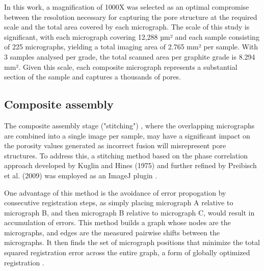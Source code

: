 \documentclass[3p,twocolumn]{elsarticle}
\begin{document}
In this work, a magnification of 1000X was selected as an optimal compromise
between the resolution necessary for capturing the pore structure at the
required scale and the total area covered by each micrograph. The scale of this
study is significant, with each micrograph covering 12,288 µm² and each sample
consisting of 225 micrographs, yielding a total imaging area of 2.765 mm² per
sample. With 3 samples analysed per grade, the total scanned area per graphite grade is
8.294 mm². Given this scale, each composite micrograph represents a substantial
section of the sample and captures a thousands of pores.

\subsection{Composite assembly}

The composite assembly stage ("stitching") , where the overlapping micrographs
are combined into a single image per sample, may have a significant impact on
the porosity values generated as incorrect fusion will misrepresent pore
structures. To address this, a stitching method based on the phase correlation
approach developed by Kuglin and Hines (1975) and further refined by Preibisch
et al. (2009) was employed as an ImageJ plugin \citep{Kuglin1975,
Preibisch2009}.
	
One advantage of this method is the avoidance of error propogation by
consecutive registration steps, as simply placing micrograph A relative to
micrograph B, and then micrograph B relative to micrograph C, would result in
accumulation of errors. This method builds a graph whose nodes are the
micrographs, and edges are the measured pairwise shifts between the micrographs.
It then finds the set of micrograph positions that minimize the total squared
registration error across the entire graph, a form of globally optimized
registration \citep{Preibisch2009}.
\end{document}
